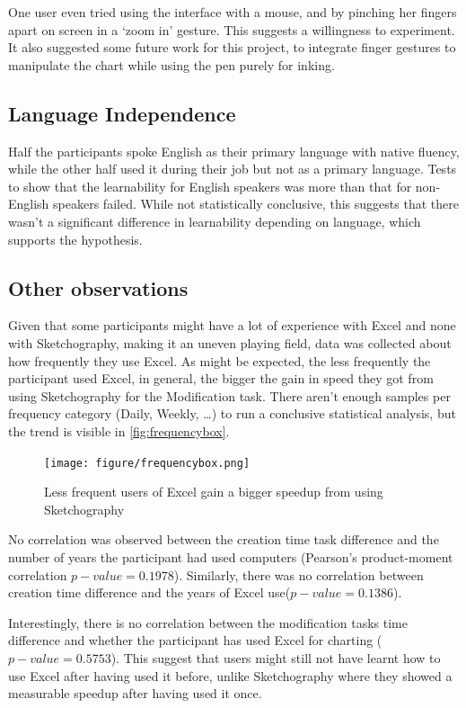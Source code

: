 One user even tried using the interface with a mouse, and by pinching her fingers apart on screen in a `zoom in' gesture. This suggests a willingness to experiment. It also suggested some future work for this project, to integrate finger gestures to manipulate the chart while using the pen purely for inking.

\subsection{Language Independence}
Half the participants spoke English as their primary language with native fluency, while the other half used it during their job but not as a primary language. Tests to show that the learnability for English speakers was more than that for non-English speakers failed. While not statistically conclusive, this suggests that there wasn't a significant difference in learnability depending on language, which supports the hypothesis.

\subsection{Other observations}
Given that some participants might have a lot of experience with Excel and none with Sketchography, making it an uneven playing field, data was collected about how frequently they use Excel. As might be expected, the less frequently the participant used Excel, in general, the bigger the gain in speed they got from using Sketchography for the Modification task. There aren't enough samples per frequency category (Daily, Weekly, \ldots) to run a conclusive statistical analysis, but the trend is visible in \autoref{fig:frequencybox}.

\begin{figure}[H]
\begin{center}
\texttt{[image: figure/frequencybox.png]}
\end{center}
\caption{Less frequent users of Excel gain a bigger speedup from using Sketchography}
\label{fig:frequencybox}
\end{figure}


No correlation was observed between the creation time task difference and the number of years the participant had used computers (Pearson's product-moment correlation $p-value = 0.1978$). Similarly, there was no correlation between creation time difference and the years of Excel use($p-value = 0.1386$).  

Interestingly, there is no correlation between the modification tasks time difference and whether the participant has used Excel for charting ($p-value = 0.5753$). This suggest that users might still not have learnt how to use Excel after having used it before, unlike Sketchography where they showed a measurable speedup after having used it once.

